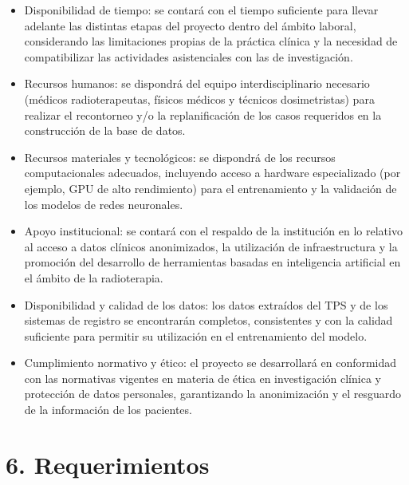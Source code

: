\documentclass[
11pt, %
codirector, %
]{charter}
\begin{document}
\begin{itemize}
	\item Disponibilidad de tiempo: se contará con el tiempo suficiente para llevar adelante las distintas etapas del proyecto dentro del ámbito laboral, considerando las limitaciones propias de la práctica clínica y la necesidad de compatibilizar las actividades asistenciales con las de investigación.
	\item Recursos humanos: se dispondrá del equipo interdisciplinario necesario (médicos radioterapeutas, físicos médicos y técnicos dosimetristas) para realizar el recontorneo y/o la replanificación de los casos requeridos en la construcción de la base de datos.
	\item Recursos materiales y tecnológicos: se dispondrá de los recursos computacionales adecuados, incluyendo acceso a hardware especializado (por ejemplo, GPU de alto rendimiento) para el entrenamiento y la validación de los modelos de redes neuronales.
	\item Apoyo institucional: se contará con el respaldo de la institución en lo relativo al acceso a datos clínicos anonimizados, la utilización de infraestructura y la promoción del desarrollo de herramientas basadas en inteligencia artificial en el ámbito de la radioterapia.
	\item Disponibilidad y calidad de los datos: los datos extraídos del TPS y de los sistemas de registro se encontrarán completos, consistentes y con la calidad suficiente para permitir su utilización en el entrenamiento del modelo.
	\item Cumplimiento normativo y ético: el proyecto se desarrollará en conformidad con las normativas vigentes en materia de ética en investigación clínica y protección de datos personales, garantizando la anonimización y el resguardo de la información de los pacientes.
\end{itemize}


\section{6. Requerimientos}
\label{sec:requerimientos}
\end{document}
